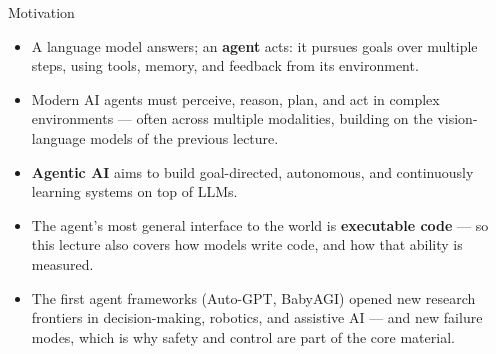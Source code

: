 \begin{frame}{Motivation}
  \begin{itemize}
    \item A language model answers; an \textbf{agent} acts: it pursues goals over multiple steps, using
      tools, memory, and feedback from its environment.
    \item Modern AI agents must perceive, reason, plan, and act in complex environments --- often across
      multiple modalities, building on the vision-language models of the previous lecture.
    \item \textbf{Agentic AI} aims to build goal-directed, autonomous, and continuously learning systems on
      top of LLMs.
    \item The agent's most general interface to the world is \textbf{executable code} --- so this lecture
      also covers how models write code, and how that ability is measured.
    \item The first agent frameworks (Auto-GPT, BabyAGI) opened new research frontiers in decision-making,
      robotics, and assistive AI --- and new failure modes, which is why safety and control are part of the
      core material.
  \end{itemize}
\end{frame}
